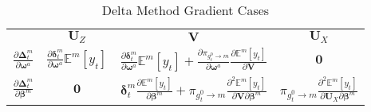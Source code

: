 \documentclass[12pt]{article}
\newcommand{\gateprod}[2]{\pi_{#1 \longrightarrow #2}}
\newcommand{\Eym}{\mathbb{E}^{m} \left[ y_{t} \right]}
\theoremstyle{definition}
\begin{document}
\begin{table}
  \begin{center}
    \begin{tabular}{| l | c c c |}
    \hline
                                                                                    & \underline{$\boldsymbol{U}_{Z}$}                                                            & \underline{$\boldsymbol{V}$}                                                                                                                                                                                           & \underline{$\boldsymbol{U}_{X}$}   \\ [2ex]
    $\frac{\partial \boldsymbol{\Delta}_{t}^{m}}{\partial \boldsymbol{\omega}^{a}}$ & $\frac{\partial \boldsymbol{\delta}^{m}_{t}}{\partial \boldsymbol{\omega}^{a}} \Eym$        & $\frac{\partial \boldsymbol{\delta}^{m}_{t}}{\partial \boldsymbol{\omega}^{a}} \Eym + \frac{\partial \gateprod{g^{0}_{t}}{m}}{\partial \boldsymbol{\omega}^{a}}  \frac{\partial \Eym}{{\partial \boldsymbol{V}}}$  & $\boldsymbol{0}$                   \\ [2ex]
    $\frac{\partial \boldsymbol{\Delta}_{t}^{m}}{\partial \boldsymbol{\beta}^{m}}$  & $\boldsymbol{0}$                                                                            & $\boldsymbol{\delta}^{m}_{t} \frac{\partial \Eym}{\partial \boldsymbol{\beta}^{m}} + \gateprod{g^{0}_{t}}{m}   \frac{\partial^{2} \Eym}{\partial \boldsymbol{V} \partial \boldsymbol{\beta}^{m}}$    & $\gateprod{g^{0}_{t}}{m}  \frac{\partial^{2} \Eym}{\partial \boldsymbol{U}_{X} \partial \boldsymbol{\beta}^{m}}$  \\ [1ex]
    \hline
    \end{tabular}
  \caption{\label{tbl:delta_method_gradients} Delta Method Gradient Cases}
  \end{center}
\end{table}
\end{document}
